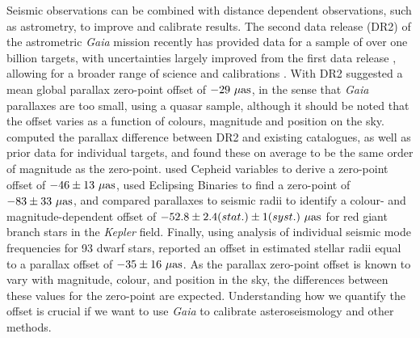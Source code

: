 \documentclass[fleqn,usenatbib]{mnras}
\newcommand{\kepler}{\emph{Kepler}\xspace}
\newcommand{\gaia}{\emph{Gaia}\xspace}
\newcommand{\new}[1]{#1}
\newcommand{\up}[1]{#1}
\begin{document}
Seismic observations can be combined with distance dependent observations, such as astrometry, to improve and calibrate results. The second data release (DR2) of the astrometric \gaia mission \citep{art:gaiacollaboration+2018} recently has provided data for a sample of over one billion targets, with uncertainties largely improved from the first data release \citep[DR1, TGAS][]{art:gaiacollaboration+2016}, allowing for a broader range of science and calibrations \citep{art:zinn+2018}. With DR2 \cite{art:lindegren+2018} suggested a mean global parallax zero-point offset of $-29\ \mu\rm{as}$, in the sense that \gaia parallaxes are too small, using a quasar sample, although it should be noted that the offset varies as a function of colours, magnitude and position on the sky. \cite{art:arenou+2018} computed the parallax difference between DR2 and existing catalogues, as well as prior data for individual targets, and found these on average to be the same order of magnitude as the \cite{art:lindegren+2018} zero-point. \cite{art:riess+2018} used Cepheid variables to derive a zero-point offset of $-46\pm13\ \mu\rm{as}$, \cite{art:stassun+torres2018} used Eclipsing Binaries to find a zero-point of $-83\pm33\ \mu\rm{as}$, and \cite{art:zinn+2018} compared parallaxes to seismic radii to identify a colour- and magnitude-dependent offset of $-52.8\pm2.4(stat.)\pm1(syst.)\ \mu\rm{as}$ for red giant branch stars in the \kepler field. Finally, using analysis of individual seismic mode frequencies for 93 dwarf stars, \cite{art:sahlholdt+silvaaguirre2018} reported an offset in estimated stellar radii equal to a parallax offset of $-35 \pm 16\ \mu \rm as$. \up{As the parallax zero-point offset is known to vary with magnitude, colour, and position in the sky, the differences between these values for the zero-point are expected. Understanding how we quantify the offset is crucial if we want to use \gaia to calibrate asteroseismology and other methods.}\\

\end{document}
